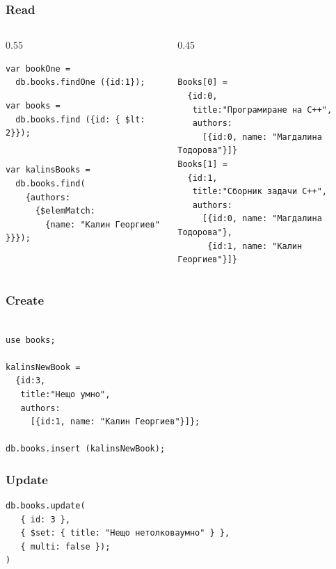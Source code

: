 \documentclass{beamer}
\begin{document}
\begin{frame}[fragile]
\frametitle{Read}

\lstset{language=JavaScript}


\begin{columns}
  \begin{column}{0.55\textwidth}

\begin{lstlisting}
var bookOne =
  db.books.findOne ({id:1});
\end{lstlisting}


\begin{lstlisting}
var books =
  db.books.find ({id: { $lt: 2}});
\end{lstlisting}


\begin{lstlisting}

var kalinsBooks =
  db.books.find(
    {authors:
      {$elemMatch:
        {name: "Калин Георгиев" }}});
\end{lstlisting}

  \end{column}
  \begin{column}{0.45\textwidth}
\begin{lstlisting}

Books[0] =
  {id:0,
   title:"Програмиране на C++",
   authors:
     [{id:0, name: "Магдалина Тодорова"}]}
Books[1] =
  {id:1,
   title:"Сборник задачи C++",
   authors:
     [{id:0, name: "Магдалина Тодорова"},
      {id:1, name: "Калин Георгиев"}]}
\end{lstlisting}
  \end{column}
\end{columns}


\end{frame}


\begin{frame}[fragile]
\frametitle{Create}

\begin{lstlisting}

use books;

kalinsNewBook =
  {id:3,
   title:"Нещо умно",
   authors:
     [{id:1, name: "Калин Георгиев"}]};

db.books.insert (kalinsNewBook);
\end{lstlisting}


\end{frame}


\begin{frame}[fragile]
\frametitle{Update}

\begin{lstlisting}
db.books.update(
   { id: 3 },
   { $set: { title: "Нещо нетолковаумно" } },
   { multi: false });
)\end{lstlisting}


\end{frame}
\end{document}
